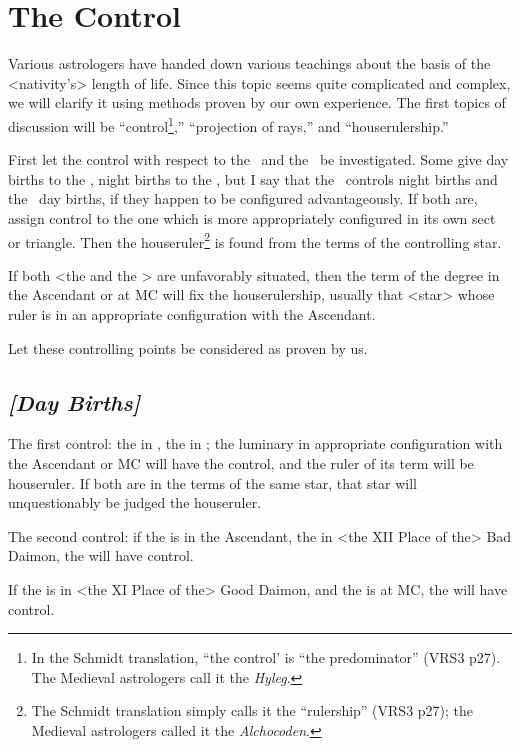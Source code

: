 \section{The Control}

Various astrologers have handed down various teachings about the basis of the <nativity’s> length of life. Since this topic seems quite complicated and complex, we will clarify it using methods proven by our own experience. The first topics of discussion will be “control\footnote{In the Schmidt translation, ``the control' is ``the predominator'' (VRS3 p27). The Medieval astrologers call it the \textsl{Hyleg}.},” “projection of rays,” and “houserulership.” 

First \mndl let the control with respect to the \Sun\, and the \Moon\, be investigated. Some give day births to the \Sun, night births to the \Moon, but I say that the \Sun\, controls night births and the \Moon\, day births, if they happen to be configured advantageously. If both are, assign control to the one which is more appropriately configured in its own sect or triangle. Then the houseruler\footnote{The Schmidt translation simply calls it the ``rulership'' (VRS3 p27); the Medieval astrologers called it the \textsl{Alchocoden}.} is found from the terms of the controlling star. 

If both <the \Sun\xspace and the \Moon> are unfavorably situated, then the term of the degree in the Ascendant or at MC will fix the houserulership, usually that <star> whose ruler is in an appropriate configuration with the Ascendant.

Let these controlling points be considered as proven by us. 

\subsection{\textit{[Day Births]}}
The first control: the \Sun\xspace in \Leo, the \Moon\xspace in \Cancer; the luminary in appropriate configuration with the Ascendant or MC will have the control, and the ruler of its term will be houseruler. If both are in the terms of the same star, that star will unquestionably be judged the houseruler.

The second control: if the \Sun\xspace is in the Ascendant, the \Moon\xspace in <the XII Place of the> Bad Daimon, the \Sun\xspace will have control. 

If the \Sun\xspace is in <the XI Place of the> Good Daimon, and the \Moon\xspace is at MC, the \Sun\xspace will have control. 

